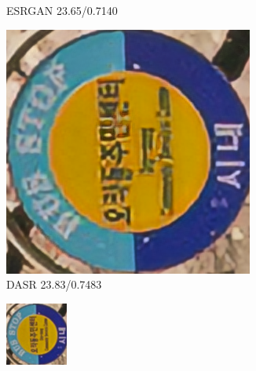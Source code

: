\begin{figure}[htbp]
\begin{subfigure}{0.3\textwidth}
        \caption{ESRGAN 23.65/0.7140} 
    \end{subfigure}
    \hfill
    \begin{subfigure}{0.3\textwidth}
        \includegraphics[width=\linewidth]{imgs/DASR_23.83_0.7483_Canon_020.png}
        \caption{DASR 23.83/0.7483} 
    \end{subfigure}
    \begin{subfigure}{0.3\textwidth}
        \includegraphics[width=\linewidth]{imgs/LR_Canon_020.png}

\end{subfigure}
\end{figure}
